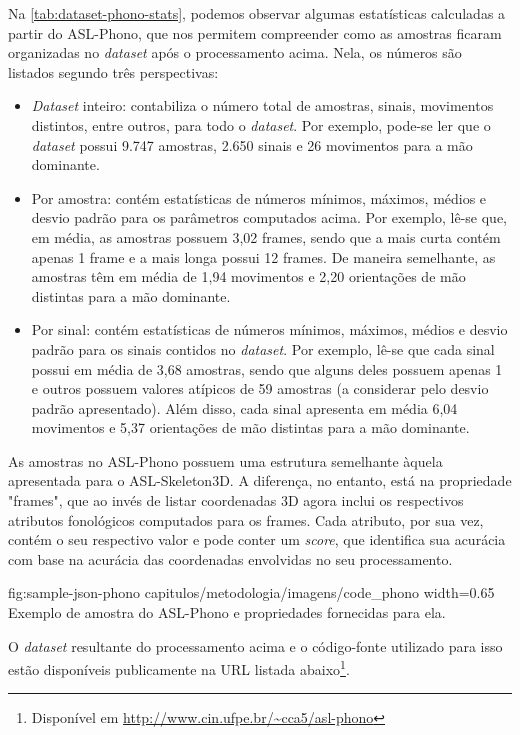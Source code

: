 Na \autoref{tab:dataset-phono-stats}, podemos observar algumas estatísticas calculadas a partir do ASL-Phono, que nos permitem compreender como as amostras ficaram organizadas no \textit{dataset} após o processamento acima. 
Nela, os números são listados segundo três perspectivas: 

\begin{itemize}
    \item \textit{Dataset} inteiro: contabiliza o número total de amostras, sinais, movimentos distintos, entre outros, para todo o \textit{dataset}. Por exemplo, pode-se ler que o \textit{dataset} possui 9.747 amostras, 2.650 sinais e 26 movimentos para a mão dominante.
    
    \item Por amostra: contém estatísticas de números mínimos, máximos, médios e desvio padrão para os parâmetros computados acima. Por exemplo, lê-se que, em média, as amostras possuem 3,02 frames, sendo que a mais curta contém apenas 1 frame e a mais longa possui 12 frames. De maneira semelhante, as amostras têm em média de 1,94 movimentos e 2,20 orientações de mão distintas para a mão dominante.

    \item Por sinal: contém estatísticas de números mínimos, máximos, médios e desvio padrão para os sinais contidos no \textit{dataset}. Por exemplo, lê-se que cada sinal possui em média de 3,68 amostras, sendo que alguns deles possuem apenas 1 e outros possuem valores atípicos de 59 amostras (a considerar pelo desvio padrão apresentado). Além disso, cada sinal apresenta em média 6,04 movimentos e 5,37 orientações de mão distintas para a mão dominante.
\end{itemize}




As amostras no ASL-Phono possuem uma estrutura semelhante àquela apresentada para o ASL-Skeleton3D. A diferença, no entanto, está na propriedade "frames", que ao invés de listar coordenadas 3D agora inclui os respectivos atributos fonológicos computados para os frames. Cada atributo, por sua vez, contém o seu respectivo valor e pode conter um \textit{score}, que identifica sua acurácia com base na acurácia das coordenadas envolvidas no seu processamento.

\figura
    {fig:sample-json-phono} %
    {capitulos/metodologia/imagens/code_phono} %
    {width=0.65\linewidth} %
    {Exemplo de amostra do ASL-Phono e propriedades fornecidas para ela.} %
    {} %


O \textit{dataset} resultante do processamento acima e o código-fonte utilizado para isso estão disponíveis publicamente na URL listada abaixo\footnote{Disponível em \url{http://www.cin.ufpe.br/~cca5/asl-phono}}.